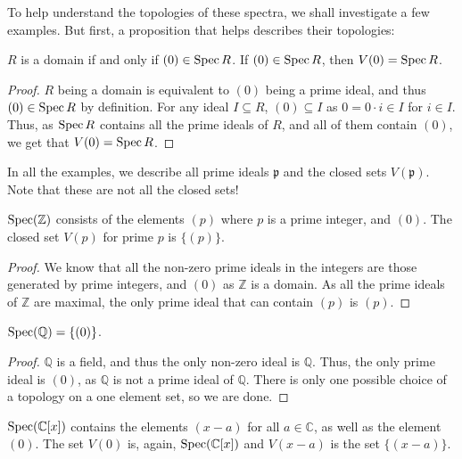 To help understand the topologies of these spectra, we shall investigate a few examples. But first, a proposition that helps describes their topologies:
\begin{proposition}
    $R$ is a domain if and only if $(0) \in \operatorname{Spec} R$. If $(0) \in \operatorname{Spec} R$, then $V(0) = \operatorname{Spec} R$.
\end{proposition}
\begin{proof}
    $R$ being a domain is equivalent to $(0)$ being a prime ideal, and thus $(0) \in \operatorname{Spec} R$ by definition. For any ideal $I \subseteq R$, $(0) \subseteq I$ as $0 = 0\cdot i \in I$ for $i \in I$. Thus, as $\operatorname{Spec} R$ contains all the prime ideals of $R$, and all of them contain $(0)$, we get that $V(0) = \operatorname{Spec} R$.
  \end{proof}

  In all the examples, we describe all prime ideals \(\mathfrak{p}\) and the closed sets \(V(\mathfrak{p})\).
  Note that these are not all the closed sets! 
\begin{example}
    $\operatorname{Spec} (\mathbb{Z})$ consists of the elements $(p)$ where $p$ is a prime integer, and $(0)$. The closed set $V(p)$ for prime $p$ is $\{(p)\}$.  
\end{example}
\begin{proof}
  We know that all the non-zero prime ideals in the integers are those generated by prime integers, and $(0)$ as $\mathbb{Z}$ is a domain. As all the prime ideals of $\mathbb{Z}$ are maximal, the only prime ideal that can contain $(p)$ is $(p)$.
\end{proof}
\begin{example}
    $\operatorname{Spec} (\mathbb{Q}) = \{ (0)\}$.
\end{example}
\begin{proof}
    $\mathbb{Q}$ is a field, and thus the only non-zero ideal is $\mathbb{Q}$. Thus, the only prime ideal is $(0)$, as $\mathbb{Q}$ is not a prime ideal of $\mathbb{Q}$. There is only one possible choice of a topology on a one element set, so we are done.
\end{proof}
\begin{example}
    $\operatorname{Spec} (\mathbb{C}[x])$ contains the elements $(x - a)$ for all $a \in \mathbb{C}$, as well as the element $(0)$.  The set $V(0)$ is, again, $\operatorname{Spec} (\mathbb{C}[x])$ and $V(x-a)$ is the set $\{(x-a)\}$.
\end{example}
